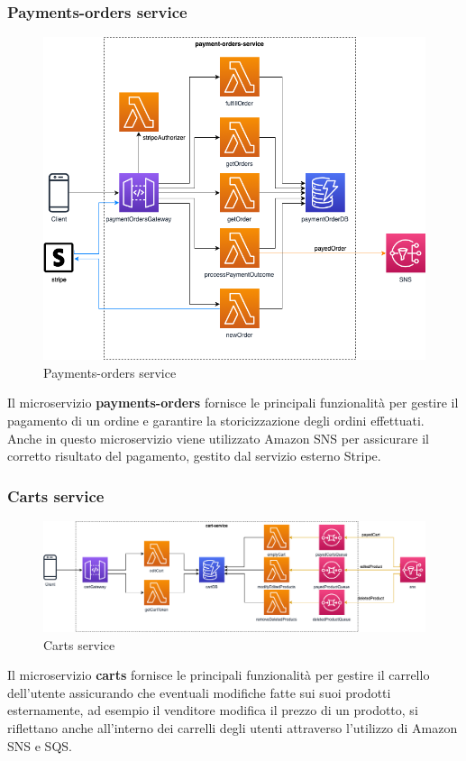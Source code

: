 \subsubsection{Payments-orders service}
\begin{figure}[H]
	\centering
	\includegraphics[scale=0.4]{Immagini/Backend/AWSPaymentOrders.png}
	\caption{Payments-orders service}
	\label{fig:Payment-orders}
\end{figure}
Il microservizio \textbf{payments-orders} fornisce le principali funzionalità per gestire il pagamento di un ordine e garantire la storicizzazione degli ordini effettuati. Anche in questo microservizio viene utilizzato Amazon SNS per assicurare il corretto risultato del pagamento, gestito dal servizio esterno Stripe.

\subsubsection{Carts service}
\begin{figure}[H]
	\centering
	\includegraphics[scale=0.4]{Immagini/Backend/AWSCart.png}
	\caption{Carts service}
	\label{fig:Cart}
\end{figure}
Il microservizio \textbf{carts} fornisce le principali funzionalità per gestire il carrello dell'utente assicurando che eventuali modifiche fatte sui suoi prodotti esternamente, ad esempio il venditore modifica il prezzo di un prodotto, si riflettano anche all'interno dei carrelli degli utenti attraverso l'utilizzo di Amazon SNS e SQS.

